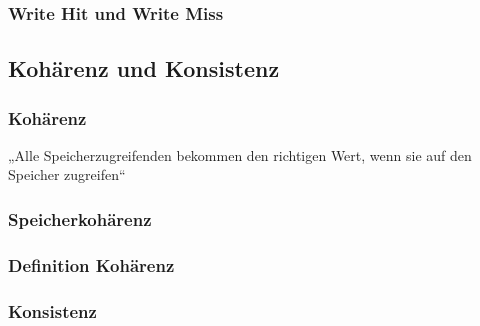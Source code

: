 \subsubsection*{Write Hit und Write Miss}

\subsection{Kohärenz und Konsistenz}
\subsubsection{Kohärenz}
„Alle Speicherzugreifenden bekommen den richtigen Wert, wenn sie auf den Speicher zugreifen“

\subsubsection*{Speicherkohärenz}

\subsubsection*{Definition Kohärenz}

\subsubsection{Konsistenz}


